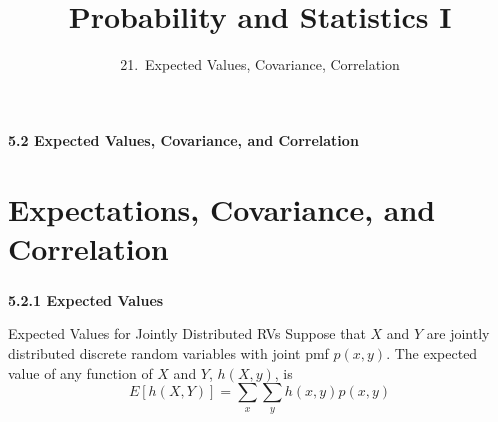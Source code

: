 

\newcommand{\lecturenum}{21}

\title[SS2857]{Probability and Statistics I}
\subtitle{\lecturenum.~Expected Values, Covariance, Correlation}

\date{}






{

\begin{frame}
  \addtocounter{framenumber}{-1}

  \maketitle
\end{frame}
}

\begin{frame}
  \frametitle{}
  
  \begin{center}
    \Large{\textbf{5.2 Expected Values, Covariance, and Correlation}}


  \end{center}
  
\end{frame}

\section{Expectations, Covariance, and Correlation}

\begin{frame}
  \frametitle{}
  
  \begin{center}
    \Large{\textbf{5.2.1 Expected Values}}
  \end{center}
  
\end{frame}


\begin{frame}
  \begin{block}{Expected Values for Jointly Distributed RVs}
    Suppose that $X$ and $Y$ are jointly distributed discrete random variables with joint pmf $p(x,y)$. The expected value of any function of $X$ and $Y$, $h(X,y)$, is
    \[
      E[h(X,Y)]=
          \sum_{x}\sum_{y}h(x,y)p(x,y)
    \]
  \end{block}
\end{frame}

